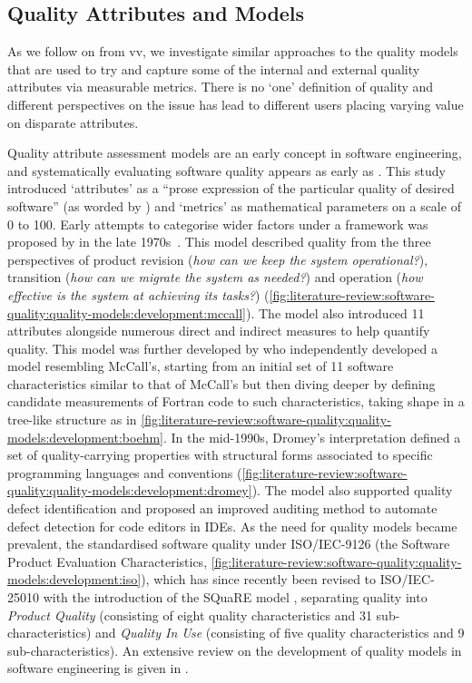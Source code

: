 \subsection{Quality Attributes and Models}

As we follow on from \gls{vv}, we investigate similar approaches to the quality models that are used to try and capture some of the internal and external quality attributes via measurable metrics. There is no `one' definition of quality and different perspectives on the issue has lead to different users placing varying value on disparate attributes.

Quality attribute assessment models are an early concept in software engineering, and systematically evaluating software quality appears as early as \citeyear{Rubey:1968fg} \citep{Rubey:1968fg}. This study introduced `attributes' as a ``prose expression of the particular quality of desired software'' (as worded by \citet{Boehm:1978vv}) and `metrics' as mathematical parameters on a scale of 0 to 100. 
Early attempts to categorise wider factors under a framework was proposed by \citeauthor*{McCall:1977uy} in the late 1970s~\citep{McCall:1977wm,Cavano:1978gz}. This model described quality from the three perspectives of product revision (\textit{how can we keep the system operational?}), transition (\textit{how can we migrate the system as needed?}) and operation (\textit{how effective is the system at achieving its tasks?}) (\cref{fig:literature-review:software-quality:quality-models:development:mccall}). The model also introduced 11 attributes alongside numerous direct and indirect measures to help quantify quality.
This model was further developed by \citet{Boehm:1978vv} who independently developed a model resembling McCall's, starting from an initial set of 11 software characteristics similar to that of McCall's but then diving deeper by defining candidate measurements of Fortran code to such characteristics, taking shape in a tree-like structure as in \cref{fig:literature-review:software-quality:quality-models:development:boehm}. 
In the mid-1990s, Dromey's interpretation \citep{Dromey:1995wy} defined a set of quality-carrying properties with structural forms associated to specific programming languages and conventions (\cref{fig:literature-review:software-quality:quality-models:development:dromey}). The model also supported quality defect identification and proposed an improved auditing method to automate defect detection for code editors in IDEs. 
As the need for quality models became prevalent, the \citeauthor{ISO9126:1999} standardised software quality under ISO/IEC-9126 \citep{ISO9126:1999} (the Software Product Evaluation Characteristics, \cref{fig:literature-review:software-quality:quality-models:development:iso}), which has since recently been revised to ISO/IEC-25010 with the introduction of the \gls{SQuaRE} model \citep{ISO25010:2011}, separating quality into \textit{Product Quality} (consisting of eight quality characteristics and 31 sub-characteristics) and \textit{Quality In Use} (consisting of five quality characteristics and 9 sub-characteristics).
An extensive review on the development of quality models in software engineering is given in \citep{AlQutaish:2010vua}.

